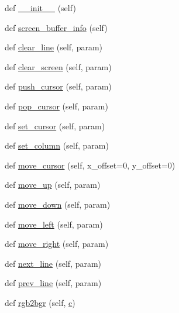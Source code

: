 \begin{DoxyCompactItemize}
\item 
def \hyperlink{classwaflib_1_1ansiterm_1_1_ansi_term_ab397a7401f836bb9f96d9e54c6333821}{\+\_\+\+\_\+init\+\_\+\+\_\+} (self)
\item 
def \hyperlink{classwaflib_1_1ansiterm_1_1_ansi_term_afdb1bac8f2508bdf2279320b85286196}{screen\+\_\+buffer\+\_\+info} (self)
\item 
def \hyperlink{classwaflib_1_1ansiterm_1_1_ansi_term_ae9df276c42e0569ad63c20c19de62b93}{clear\+\_\+line} (self, param)
\item 
def \hyperlink{classwaflib_1_1ansiterm_1_1_ansi_term_aa94cc04f29c4c51e0013e5cb87c0fd07}{clear\+\_\+screen} (self, param)
\item 
def \hyperlink{classwaflib_1_1ansiterm_1_1_ansi_term_a9f489138508401c64c6927f215d8d6da}{push\+\_\+cursor} (self, param)
\item 
def \hyperlink{classwaflib_1_1ansiterm_1_1_ansi_term_a2093c2f7ded18188b0bf2989a0083a18}{pop\+\_\+cursor} (self, param)
\item 
def \hyperlink{classwaflib_1_1ansiterm_1_1_ansi_term_aba842837a7fe351aa8459aa375249c69}{set\+\_\+cursor} (self, param)
\item 
def \hyperlink{classwaflib_1_1ansiterm_1_1_ansi_term_acd65956a7d56681cc669acca5bdd43fb}{set\+\_\+column} (self, param)
\item 
def \hyperlink{classwaflib_1_1ansiterm_1_1_ansi_term_ade95c6eb1c7ed7928780aad4e6b4e268}{move\+\_\+cursor} (self, x\+\_\+offset=0, y\+\_\+offset=0)
\item 
def \hyperlink{classwaflib_1_1ansiterm_1_1_ansi_term_a7725bd9ed185458669ad7601fb7ff9d9}{move\+\_\+up} (self, param)
\item 
def \hyperlink{classwaflib_1_1ansiterm_1_1_ansi_term_a7b2ea0403457b7cd8d0ac4088064d812}{move\+\_\+down} (self, param)
\item 
def \hyperlink{classwaflib_1_1ansiterm_1_1_ansi_term_a617dda0ced0a3e3f3443366d4a1c46bb}{move\+\_\+left} (self, param)
\item 
def \hyperlink{classwaflib_1_1ansiterm_1_1_ansi_term_a1388984c5cb5051d6c48682d1cd998b7}{move\+\_\+right} (self, param)
\item 
def \hyperlink{classwaflib_1_1ansiterm_1_1_ansi_term_a8ce79cf478dc1bf0cec2c12e28103522}{next\+\_\+line} (self, param)
\item 
def \hyperlink{classwaflib_1_1ansiterm_1_1_ansi_term_ac65f3453904e9c561f530b7c43e73f12}{prev\+\_\+line} (self, param)
\item 
def \hyperlink{classwaflib_1_1ansiterm_1_1_ansi_term_ad097d16ecb1babcef5970faccad1e7e9}{rgb2bgr} (self, \hyperlink{rfft2d_test_m_l_8m_ae0323a9039add2978bf5b49550572c7c}{c})

\end{DoxyCompactItemize}
